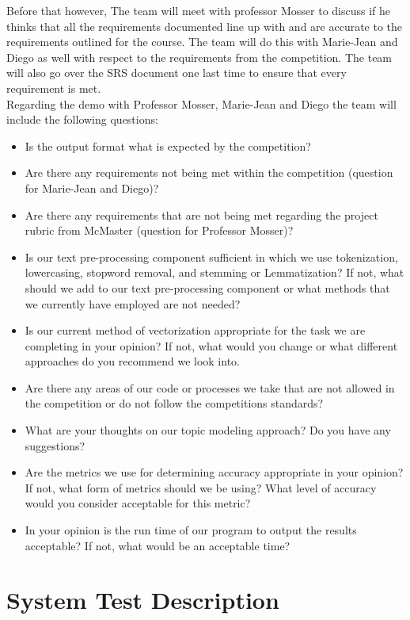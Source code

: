 \documentclass[12pt, titlepage]{article}
\begin{document}
  Before that however, The team will meet with professor Mosser to discuss if he thinks that all the requirements documented line up with and are accurate to the requirements outlined for the course. The team will do this with Marie-Jean and Diego as well with respect to the requirements from the competition. The team will also go over the SRS document one last time to ensure that every requirement is met. \\  
  
  Regarding the demo with Professor Mosser, Marie-Jean and Diego the team will include the following questions:
  
  \begin{itemize}
  \item Is the output format what is expected by the competition?
  \item Are there any requirements not being met within the competition (question for Marie-Jean and Diego)?
  \item Are there any requirements that are not being met regarding the project rubric from McMaster (question for Professor Mosser)?
  \item Is our text pre-processing component sufficient in which we use tokenization, lowercasing, stopword removal, and stemming or Lemmatization? If not, what should we add to our text pre-processing component or what methods that we currently have employed are not needed?
  \item Is our current method of vectorization appropriate for the task we are completing in your opinion? If not, what would you change or what different approaches do you recommend we look into.
  \item Are there any areas of our code or processes we take that are not allowed in the competition or do not follow the competitions standards?
  \item What are your thoughts on our topic modeling approach? Do you have any suggestions?
  \item Are the metrics we use for determining accuracy appropriate in your opinion? If not, what form of metrics should we be using? What level of accuracy would you consider acceptable for this metric?
  \item In your opinion is the run time of our program to output the results acceptable? If not, what would be an acceptable time?\end{itemize}
  

\section{System Test Description}
	
\end{document}
